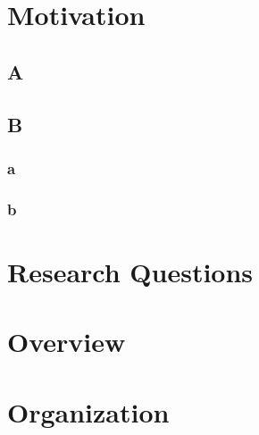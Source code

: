 
\section{Motivation}
\subsection{A}
\subsection{B}
\subsubsection{a}
\subsubsection{b}

\section{Research Questions}


\section{Overview}


\section{Organization}
